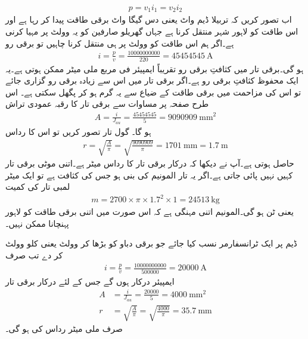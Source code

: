 %
\begin{align*}
p=v_1 i_1 = v_2 i_2
\end{align*}
اب تصور کریں کہ تربیلا ڈیم  واٹ یعنی دس گیگا واٹ  برقی طاقت پیدا کر رہا ہے اور اس طاقت کو لاہور شہر منتقل کرنا ہے جہاں گھریلو صارفین کو یہ  وولٹ پر مہیا کرنی ہے۔اگر ہم اس طاقت کو   وولٹ پر ہی منتقل کرنا چاہیں تو برقی رو
\begin{align*}
i=\frac{p}{v}=\frac{\num{10000000000}}{220}=\SI{45454545}{\ampere}
\end{align*}
ہو گی۔برقی تار میں کثافتِ برقی رو  تقریباً  ایمپیئر فی مربع ملی میٹر   ممکن ہوتی ہے۔یہ ایک محفوظ کثافتِ برقی رو ہے۔اگر برقی تار میں اس سے زیادہ برقی رو گزاری جائے تو اس کی مزاحمت میں برقی طاقت کے ضیاع سے یہ گرم ہو کر پگھل سکتی ہے۔ اس طرح صفحہ  پر  مساوات  سے برقی تار کا رقبہ عمودی تراش
\begin{align*}
A=\frac{i}{J_{au}}=\frac{45454545}{5}=\SI{9090909}{\milli\meter\squared}
\end{align*}
ہو گا۔ گول تار تصور کریں تو اس کا رداس
\begin{align*}
r=\sqrt{\frac{A}{\pi}}=\sqrt{\frac{9090909}{\pi}}=\SI{1701}{\milli\meter}=\SI{1.7}{\meter}
\end{align*}
حاصل ہوتی ہے۔آپ نے دیکھا کہ درکار برقی تار کا رداس  میٹر ہے۔اتنی موٹی برقی تار کہیں نہیں پائی جاتی ہے۔اگر یہ تار المونیم کی بنی ہو جس کی  کثافت   ہے تو ایک میٹر لمبی تار کی کمیت
\begin{align*}
m=2700 \times \pi \times 1.7^2 \times 1=\SI{24513}{\kilo\gram}
\end{align*}
یعنی  ٹن ہو گی۔المونیم اتنی مہنگی ہے کہ اس صورت میں اتنی برقی طاقت کو لاہور پہنچانا ممکن نہیں۔

ڈیم پر ایک ٹرانسفارمر نسب کیا جائے جو برقی دباو کو بڑھا کر   وولٹ یعنی  کلو وولٹ  کر دے تب صرف 
\begin{align*}
i=\frac{p}{v}=\frac{\num{10000000000}}{\num{500000}}=\SI{20000}{\ampere}
\end{align*}
ایمپیئر درکار ہوں گے جس کے لئے درکار برقی تار
\begin{align*}
A&=\frac{i}{J_{au}}=\frac{\num{20000}}{5}=\SI{4000}{\milli\meter\squared}\\
r&=\sqrt{\frac{A}{\pi}}=\sqrt{\frac{4000}{\pi}}=\SI{35.7}{\milli\meter}
\end{align*}
صرف  ملی میٹر رداس کی ہو گی۔
%

